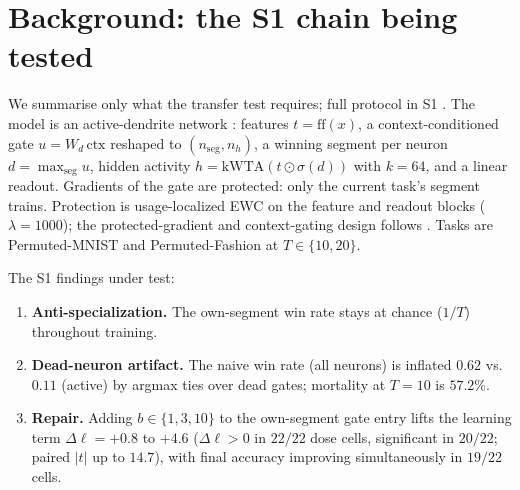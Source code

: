 \documentclass[review]{elsarticle}
\begin{document}
\section{Background: the S1 chain being tested}
\label{sec:background}

We summarise only what the transfer test requires; full protocol in
S1 \cite{zhou2026delpS1}. The model is an active-dendrite network
\cite{iyer2022}: features $t = \mathrm{ff}(x)$, a context-conditioned
gate $u = W_d\,\mathrm{ctx}$ reshaped to $(n_{\mathrm{seg}}, n_h)$, a
winning segment per neuron $d = \max_{\mathrm{seg}} u$, hidden
activity $h = \mathrm{kWTA}(t \odot \sigma(d))$ with $k{=}64$, and a
linear readout. Gradients of the gate are protected: only the current
task's segment trains. Protection is usage-localized EWC
\cite{kirkpatrick2017} on the
feature and readout blocks ($\lambda{=}1000$); the protected-gradient
and context-gating design follows \cite{iyer2022,masse2018}. Tasks are
Permuted-MNIST and Permuted-Fashion \cite{parisi2019} at $T \in \{10, 20\}$.

The S1 findings under test:

\begin{enumerate}
\item \textbf{Anti-specialization.} The own-segment win rate stays at
chance ($1/T$) throughout training.
\item \textbf{Dead-neuron artifact.} The naive win rate (all neurons)
is inflated $0.62$ vs.\ $0.11$ (active) by argmax ties over dead
gates; mortality at $T{=}10$ is $57.2\%$.
\item \textbf{Repair.} Adding $b \in \{1,3,10\}$ to the own-segment
gate entry lifts the learning term $\Delta\ell = +0.8$ to $+4.6$
($\Delta\ell>0$ in $22/22$ dose cells, significant in $20/22$; paired
$|t|$ up to $14.7$), with final accuracy improving
simultaneously in $19/22$ cells.
\end{enumerate}
\end{document}
